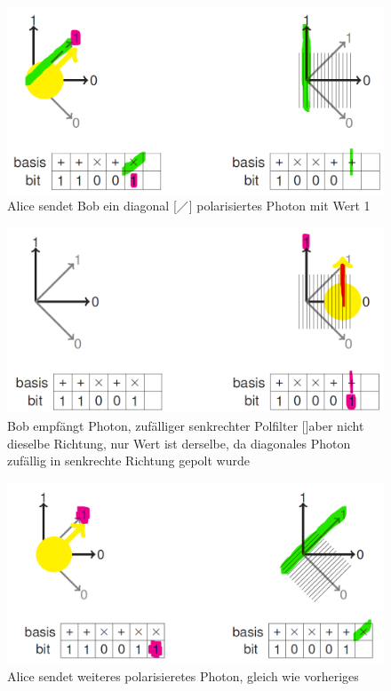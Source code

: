 \documentclass[10pt,a4paper]{article}
\begin{document}
\begin{figure}[H]
    \begin{center}
    \includegraphics[width=13cm]{images/Qubit0.png}
    \caption{Alice sendet Bob ein diagonal [$\diagup$] polarisiertes Photon mit Wert 1}
    \label{Qubit0}
    \end{center}
\end{figure}
\begin{figure}[H]
    \begin{center}
    \includegraphics[width=13cm]{images/Qubit1.png}
    \caption{Bob empfängt Photon, zufälliger senkrechter Polfilter [\textbar]aber nicht dieselbe Richtung, nur Wert ist derselbe, da diagonales Photon zufällig in senkrechte Richtung gepolt wurde}
    \label{Qubit1}
    \end{center}
\end{figure}
\begin{figure}[H]
    \begin{center}
    \includegraphics[width=14cm]{images/Qubit2.png}
    \caption{Alice sendet weiteres polarisieretes Photon, gleich wie vorheriges}
    \label{Qubit2}
    \end{center}
\end{figure}
\end{document}
